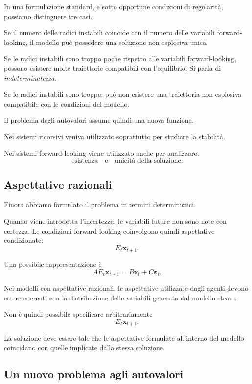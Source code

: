 \documentclass{book}
\begin{document}
In una formulazione standard, e sotto opportune condizioni di regolarità,
possiamo distinguere tre casi.

Se il numero delle radici instabili coincide con il numero delle variabili
forward-looking, il modello può possedere una soluzione non esplosiva
unica.

Se le radici instabili sono troppo poche rispetto alle variabili
forward-looking, possono esistere molte traiettorie compatibili con
l'equilibrio. Si parla di \emph{indeterminatezza}.

Se le radici instabili sono troppe, può non esistere una traiettoria
non esplosiva compatibile con le condizioni del modello.

Il problema degli autovalori assume quindi una nuova funzione.

Nei sistemi ricorsivi veniva utilizzato soprattutto per studiare la
stabilità.

Nei sistemi forward-looking viene utilizzato anche per analizzare:
\[
\boxed{
\text{esistenza}
\quad
\text{e}
\quad
\text{unicità della soluzione}
}.
\]


\subsection{Aspettative razionali}

Finora abbiamo formulato il problema in termini deterministici.

Quando viene introdotta l'incertezza, le variabili future non sono note con
certezza. Le condizioni forward-looking coinvolgono quindi aspettative
condizionate:
\[
E_t\mathbf{x}_{t+1}.
\]

Una possibile rappresentazione è
\[
A E_t\mathbf{x}_{t+1}
=
B\mathbf{x}_t
+
C\boldsymbol{\varepsilon}_t.
\]

Nei modelli con aspettative razionali, le aspettative utilizzate dagli
agenti devono essere coerenti con la distribuzione delle variabili
generata dal modello stesso.

Non è quindi possibile specificare arbitrariamente
\[
E_t\mathbf{x}_{t+1}.
\]

La soluzione deve essere tale che le aspettative formulate all'interno
del modello coincidano con quelle implicate dalla stessa soluzione.


\subsection{Un nuovo problema agli autovalori}
\end{document}
